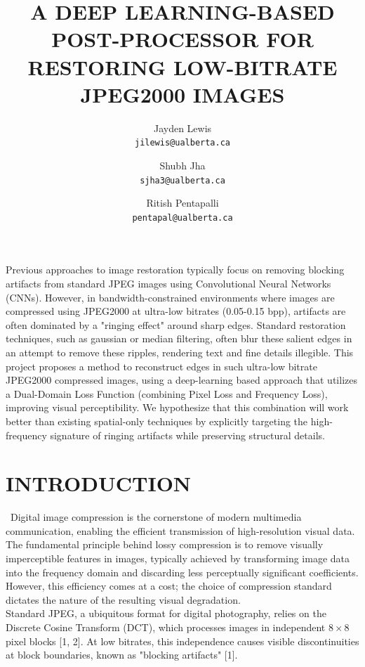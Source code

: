 \documentclass[12pt]{article}
\title{\large A DEEP LEARNING-BASED POST-PROCESSOR FOR RESTORING LOW-BITRATE JPEG2000 IMAGES}
\author{
    Jayden Lewis \\ 
    \small \texttt{jilewis@ualberta.ca}
    \and 
    Shubh Jha \\ 
    \small \texttt{sjha3@ualberta.ca}
    \and
    Ritish Pentapalli \\ 
    \small \texttt{pentapal@ualberta.ca} 
}
\date{}
\renewenvironment{abstract}
 {\begin{center}
  \bfseries \abstractname\vspace{-.5em}\vspace{0pt}
  \end{center}
  \list{}{
    \listparindent 0.5cm
    \itemindent    \listparindent
    \leftmargin    0pt        %
    \rightmargin   \leftmargin
    \parsep        0pt
  }
  \item\relax}
 {\endlist}
\begin{document}
\maketitle

\begin{abstract}
Previous approaches to image restoration typically focus on removing blocking artifacts from standard JPEG images using Convolutional Neural Networks (CNNs). However, in bandwidth-constrained environments where images are compressed using JPEG2000 at ultra-low bitrates (0.05-0.15 bpp), artifacts are often dominated by a "ringing effect" around sharp edges. Standard restoration techniques, such as gaussian or median filtering, often blur these salient edges in an attempt to remove these ripples, rendering text and fine details illegible. This project proposes a method to reconstruct edges in such ultra-low bitrate JPEG2000 compressed images, using a deep-learning based approach that utilizes a Dual-Domain Loss Function (combining Pixel Loss and Frequency Loss), improving visual perceptibility. We hypothesize that this combination will work better than existing spatial-only techniques by explicitly targeting the high-frequency signature of ringing artifacts while preserving structural details.
\end{abstract}

\section*{{\large I}\small{NTRODUCTION}}

\quad \, Digital image compression is the cornerstone of modern multimedia communication, enabling the efficient transmission of high-resolution visual data. The fundamental principle behind lossy compression is to remove visually imperceptible features in images, typically achieved by transforming image data into the frequency domain and discarding less perceptually significant coefficients. However, this efficiency comes at a cost; the choice of compression standard dictates the nature of the resulting visual degradation. \\

Standard JPEG, a ubiquitous format for digital photography, relies on the Discrete Cosine Transform (DCT), which processes images in independent $8\times8$ pixel blocks [1, 2]. At low bitrates, this independence causes visible discontinuities at block boundaries, known as "blocking artifacts" [1]. \\
\end{document}

